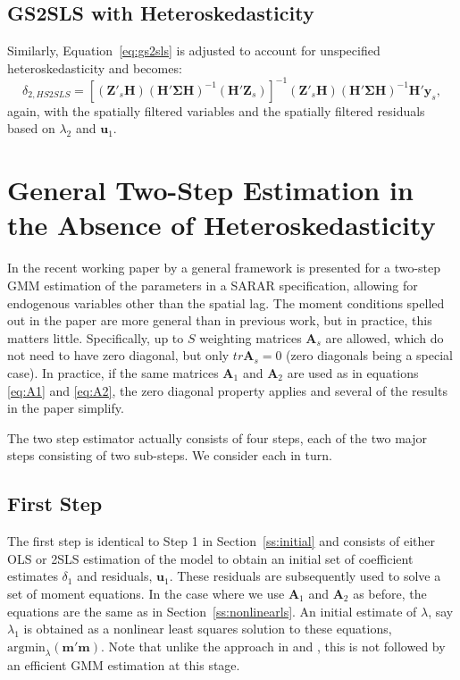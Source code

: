 \documentclass{article}
\begin{document}
\subsection{GS2SLS with Heteroskedasticity}
Similarly, Equation~\ref{eq:gs2sls} is adjusted to account for unspecified heteroskedasticity
and becomes:
\begin{equation*}
\delta_{2,HS2SLS} = [ ( \mathbf{Z'}_s \mathbf{H} )(\mathbf{H' \Sigma H})^{-1} ( \mathbf{H'} \mathbf{Z}_s ) ]^{-1} ( \mathbf{Z'}_s \mathbf{H} ) (\mathbf{H' \Sigma H})^{-1} \mathbf{H'} \mathbf{y}_s,
\end{equation*}
again, with the spatially filtered variables and the spatially filtered residuals based on $\lambda_2$
and $\mathbf{u}_1$.

\section{General Two-Step Estimation in the Absence of Heteroskedasticity}
In the recent working paper by \cite{Drukkeretal:10} a general framework is presented
for a two-step GMM estimation of the parameters in a SARAR specification, allowing
for endogenous variables other than the spatial lag. The moment conditions spelled out in the
paper are more general than in previous work, but in practice, this matters little.
Specifically, up to $S$ weighting matrices $\mathbf{A}_s$ are allowed, which do not need
to have zero diagonal, but only $tr \mathbf{A}_s = 0$ (zero diagonals being a special
case). In practice,
if the same matrices $\mathbf{A}_1$ and $\mathbf{A}_2$ are used as in equations
 \ref{eq:A1} and \ref{eq:A2}, the zero diagonal property applies and several of the
 results in the paper simplify.
 
 The two step estimator actually consists of four steps, each of the two major
 steps consisting of two sub-steps. We consider each in turn.
 
 \subsection{First Step}
 The first step is identical to Step 1 in Section~\ref{ss:initial} and consists of either
 OLS or 2SLS estimation of the model to obtain an initial set of 
 coefficient estimates $\delta_1$ and residuals, $\mathbf{u}_1$.
 These residuals are subsequently used to solve a set of moment equations.
 In the case where we use $\mathbf{A}_1$ and $\mathbf{A}_2$ as before, the equations
 are the same as in Section~\ref{ss:nonlinearls}. An initial estimate of $\lambda$,
 say $\lambda_1$ is obtained as a nonlinear least
squares solution to these equations, $\mbox{argmin}_\lambda (\mathbf{m'm})$.
Note that unlike the approach in \cite{KelejianPrucha:09} and \cite{Arraizetal:10},
this is not followed by an efficient GMM estimation at this stage.
\end{document}
